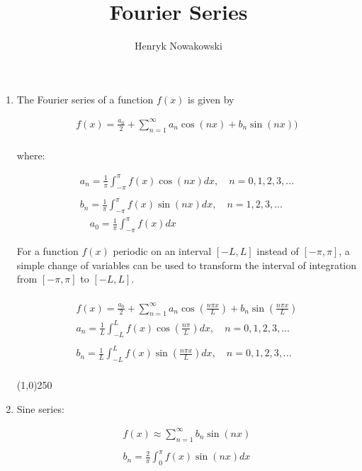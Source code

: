 \documentclass[11pt]{article}
\begin{document}
\author{Henryk Nowakowski}
\title{Fourier Series}
\maketitle




\begin{enumerate}

\item %

	The Fourier series of a function $f(x)$ is given by 


\begin{align*}
f(x) = \frac{a_{0}}{2}+\sum_{n=1}^{\infty} a_{n}\cos(nx) + b_{n}\sin(nx))\\
\end{align*}

where: 

\begin{align*}
a_{n}= \frac{1}{\pi}\int_{-\pi}^{\pi} f(x) \cos(nx) dx,\quad n=0,1,2,3,... \\
\\ b_{n}= \frac{1}{\pi}\int_{-\pi}^{\pi} f(x) \sin(nx) dx, \quad n=1,2,3,... \\
\quad a_{0} = \frac{1}{\pi} \int_{-\pi}^{\pi} f(x) dx
\end{align*}

\newpage

 For a function $f(x)$ periodic on an interval $[-L,L]$ instead of  $[-\pi,\pi]$, a simple change of variables can be used to transform the interval of integration from $[-\pi,\pi]$ to $[-L,L]$.

\begin{align*}
\\ 
f(x) = \frac{a_{0}}{2}+\sum_{n=1}^{\infty} a_{n}\cos(\frac{n \pi x}{L}) + b_{n}\sin(\frac{n \pi x}{L}) \\
a_{n}= \frac{1}{L}\int_{-L}^{L} f(x) \cos(\frac{n\pi}{L}) dx,\quad
n=0,1,2,3,... \\ \\ b_{n}= \frac{1}{L}\int_{-L}^{L} f(x) \sin(\frac{n\pi x}{L}) dx,\quad
n=0,1,2,3,... \\
\end{align*}


\line(1,0){250}
\newpage	
\item 

	Sine series:

\begin{align*}
    f(x) \approx \sum_{n=1}^{\infty} b_{n} \sin(nx) \\ \\
    b_{n} = \frac{2}{\pi} \int_{0}^{\pi} f(x)\sin(nx) dx
\end{align*}


\end{enumerate}
\end{document}
